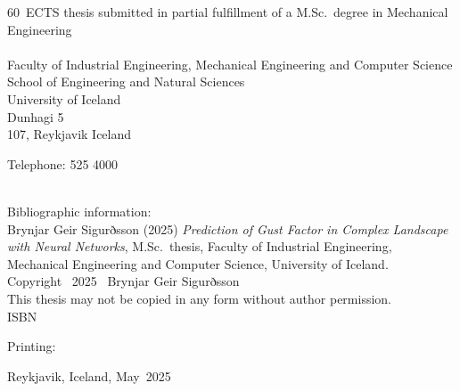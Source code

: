 \documentclass[a4paper,12pt,twoside,BCOR=10mm,openany]{scrbook}
\def\thesisyear{2025}       					%
\def\thesismonth{May}					%
\def\thesisauthor{Brynjar Geir Sigurðsson}				%
\def\thesistitle{Prediction of Gust Factor in \\Complex Landscape with Neural Networks} %
\def\thesiscredits{60} 						%
\def\thesissubject{Mechanical Engineering}
\def\thesiskind{M.Sc.}					%
\def\thesisschool{School of Engineering and {Natural Sciences}}		%
\def\thesisfaculty{Industrial Engineering, Mechanical Engineering and Computer Science}%
\def\thesisaddress{Dunhagi 5}			        %
\def\thesispostalcode{107}			                %
\def\thesistelephone{525 4000}					%
\def\thesisISBN{}           					%
\def\thesisprinting{}						%
\def\thesislicense{This thesis may not be copied in any form without author permission.} %
\newcommand{\removelinebreaks}[1]{%
  \begingroup\def\\{}#1\endgroup}
\begin{document}
\begin{titlepage}
    
  \thesiscredits ~ECTS thesis submitted in partial fulfillment of a \thesiskind{}~degree in \thesissubject
\\ \\
  Faculty of \thesisfaculty \\
  \thesisschool \\
  University of Iceland \\
  \thesisaddress \\ 
  \thesispostalcode, Reykjavik 
  Iceland

  Telephone: \thesistelephone \\ \\ 
  \vspace*{\lineskip}

  Bibliographic information: \\
  \thesisauthor{} (\thesisyear{}) \emph{\removelinebreaks{\thesistitle{}}}, \thesiskind{}~thesis, Faculty of \thesisfaculty, University of Iceland.\\

  Copyright \textcopyright~\thesisyear~ \thesisauthor \\
  \thesislicense{}\\

  \ifx\thesisISBN\empty %
  \else
  ISBN~\thesisISBN
  \fi
  
  \ifx\thesisprinting\empty %
  \else
  Printing: \thesisprinting \\
  \fi


  Reykjavik, Iceland, \thesismonth~\thesisyear \\

\end{titlepage}

\cleardoublepage


\setcounter{page}{5}

\end{document}
